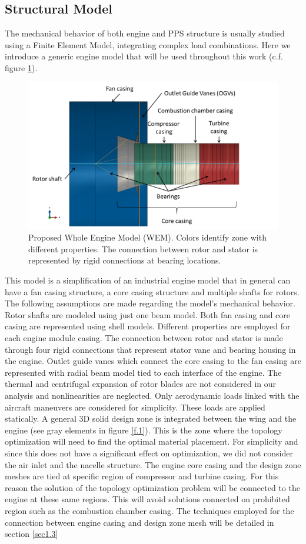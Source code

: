 \subsection{Structural Model}
\label{ssec1.2.1}
The mechanical behavior of both engine and PPS structure is usually studied using a Finite Element Model, integrating complex load combinations. Here we introduce a generic engine model that will be used throughout this work (c.f. figure \ref{enginewem}). 
\begin{figure}[hbt!]
\centering
\includegraphics[width=1\textwidth]{images/Ch1/enginegeometry}
\caption{Proposed Whole Engine Model (WEM). Colors identify zone with different properties. The connection between rotor and stator is represented by rigid connections at bearing locations.\label{enginewem}}
\end{figure}
This model is a simplification of an industrial engine model that in general can have a fan casing structure, a core casing structure and multiple shafts for rotors. The following assumptions are made regarding the model's mechanical behavior. Rotor shafts are modeled using just one beam model. Both fan casing and core casing are represented using shell models. Different properties are employed for each engine module casing. The connection between rotor and stator is made through four rigid connections that represent stator vane and bearing housing in the engine. Outlet guide vanes which connect the core casing to the fan casing are represented with radial beam model tied to each interface of the engine. The thermal and centrifugal expansion of rotor blades are not considered in our analysis and nonlinearities are neglected. Only aerodynamic loads linked with the aircraft maneuvers are considered for simplicity. These loads are applied statically. A general 3D solid design zone is integrated between the wing and the engine (see gray elements in figure \ref{f.1}). This is the zone where the topology optimization will need to find the optimal material placement. For simplicity and since this does not have a significant effect on optimization, we did not consider the air inlet and the nacelle structure.  The engine core casing and the design zone meshes are tied at specific region of compressor and turbine casing. For this reason the solution of the topology optimization problem will be connected to the engine at these same regions. This will avoid solutions connected on prohibited region such as the combustion chamber casing. The techniques employed for the connection between engine casing and design zone mesh will be detailed in section \ref{sec1.3}
